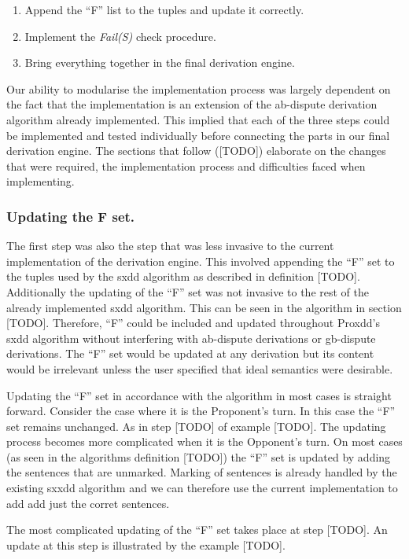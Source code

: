 \begin{enumerate}
\item Append the ``F'' list to the tuples and update it correctly.
\item Implement the \emph{Fail(S)} check procedure.
\item Bring everything together in the final derivation engine.
\end{enumerate}

Our ability to modularise the implementation process was largely dependent on the fact that the implementation is an extension of the ab-dispute derivation algorithm already implemented. This implied that each of the three steps could be implemented and tested individually before connecting the parts in our final derivation engine. The sections that follow ([TODO]) elaborate on the changes that were required, the implementation process and difficulties faced when implementing.

\subsubsection{Updating the F set.}

The first step was also the step that was less invasive to the current implementation of the derivation engine. This involved appending the ``F'' set to the tuples used by the sxdd algorithm as described in definition [TODO]. Additionally the updating of the ``F'' set was not invasive to the rest of the already implemented sxdd algorithm. This can be seen in the algorithm in section [TODO]. Therefore, ``F'' could be included and updated throughout Proxdd's sxdd algorithm without interfering with ab-dispute derivations or gb-dispute derivations. The ``F'' set would be updated at any derivation but its content would be irrelevant unless the user specified that ideal semantics were desirable.

Updating the ``F'' set in accordance with the algorithm in most cases is straight forward. Consider the case where it is the Proponent's turn. In this case the ``F'' set remains unchanged. As in step [TODO] of example [TODO]. The updating process becomes more complicated when it is the Opponent's turn. On most cases (as seen in the algorithms definition [TODO]) the ``F'' set is updated by adding the sentences that are unmarked. Marking of sentences is already handled by the existing sxxdd algorithm and we can therefore use the current implementation to add add just the corret sentences.

The most complicated updating of the ``F'' set takes place at step [TODO].	An update at this step is illustrated by the example [TODO].

